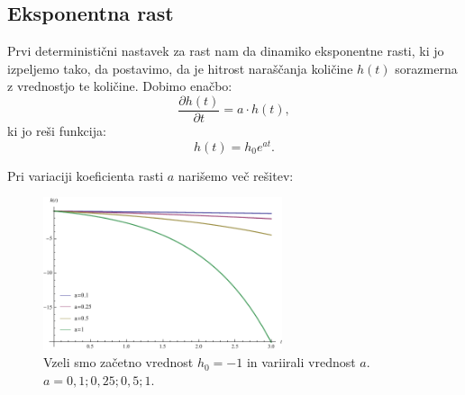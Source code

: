\documentclass[a4paper, twoside, 12pt]{book}
\begin{document}

\subsection{Eksponentna rast}

Prvi deterministični nastavek za rast nam da dinamiko eksponentne rasti, ki jo izpeljemo tako, da postavimo, da je hitrost naraščanja količine $h(t)$ sorazmerna z vrednostjo te količine. Dobimo enačbo:
    \begin{equation}
      \frac{\partial h(t)}{\partial t} = a \cdot h(t),
      \label{dinamicna-eksponentna}
    \end{equation}
ki jo reši funkcija:
    \begin{equation}
      h(t) = h_0 e^{a t}.
      \label{dinamicna-eksponentna-resitev}
    \end{equation}

Pri variaciji koeficienta rasti $a$ narišemo več rešitev:

    \begin{figure}[h]
      \begin{center}
        \includegraphics[width=7cm]{slike/eksponentna-rast}
      \end{center}
      \caption{Vzeli smo začetno vrednost $h_0 = -1$ in variirali vrednost $a$. \newline $a=0,1;0,25;0,5;1$.}
      \label{fig:eksponentna-rast}
    \end{figure}
\end{document}
